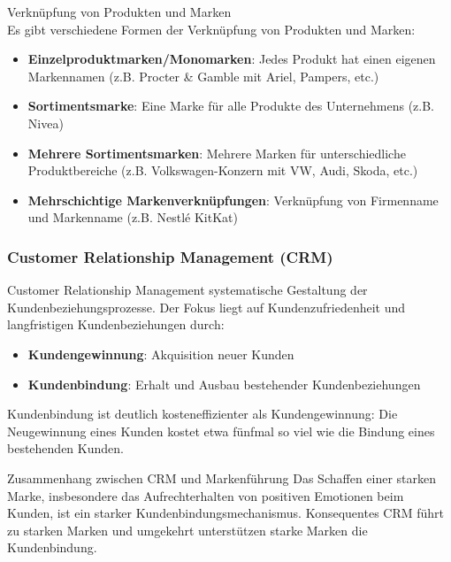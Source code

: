 \begin{definition}{Verknüpfung von Produkten und Marken}\\
Es gibt verschiedene Formen der Verknüpfung von Produkten und Marken:
\begin{itemize}
    \item \textbf{Einzelproduktmarken/Monomarken}: Jedes Produkt hat einen eigenen Markennamen (z.B. Procter \& Gamble mit Ariel, Pampers, etc.)
    \item \textbf{Sortimentsmarke}: Eine Marke für alle Produkte des Unternehmens (z.B. Nivea)
    \item \textbf{Mehrere Sortimentsmarken}: Mehrere Marken für unterschiedliche Produktbereiche (z.B. Volkswagen-Konzern mit VW, Audi, Skoda, etc.)
    \item \textbf{Mehrschichtige Markenverknüpfungen}: Verknüpfung von Firmenname und Markenname (z.B. Nestlé KitKat)
\end{itemize}
\end{definition}

\multend

\subsubsection{Customer Relationship Management (CRM)}

\begin{definition}{Customer Relationship Management}
    systematische Gestaltung der Kundenbeziehungsprozesse. Der Fokus liegt auf Kundenzufriedenheit und langfristigen Kundenbeziehungen durch:
\begin{itemize}
    \item \textbf{Kundengewinnung}: Akquisition neuer Kunden
    \item \textbf{Kundenbindung}: Erhalt und Ausbau bestehender Kundenbeziehungen
\end{itemize}

Kundenbindung ist deutlich kosteneffizienter als Kundengewinnung: Die Neugewinnung eines Kunden kostet etwa fünfmal so viel wie die Bindung eines bestehenden Kunden.
\end{definition}

\begin{concept}{Zusammenhang zwischen CRM und Markenführung}
Das Schaffen einer starken Marke, insbesondere das Aufrechterhalten von positiven Emotionen beim Kunden, ist ein starker Kundenbindungsmechanismus. Konsequentes CRM führt zu starken Marken und umgekehrt unterstützen starke Marken die Kundenbindung.
\end{concept}



